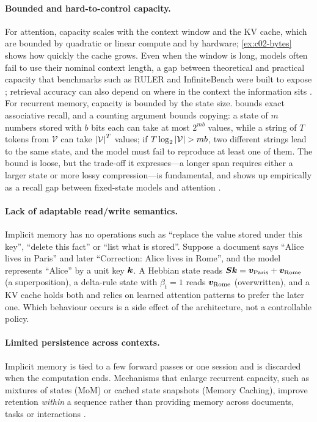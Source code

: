 \paragraph{Bounded and hard-to-control capacity.} For attention, capacity scales with the context
window and the KV cache, which are bounded by quadratic or linear compute and by hardware;
\cref{ex:c02-bytes} shows how quickly the cache grows. Even when the window is long, models often
fail to use their nominal context length, a gap between theoretical and practical capacity that
benchmarks such as RULER and InfiniteBench were built to expose \citep{hsieh2024ruler,zhang2024infbench};
retrieval accuracy can also depend on where in the context the information sits
\citep{c02-liu2024lost}. For recurrent memory, capacity is bounded by the state size.
 bounds exact associative recall, and a counting argument bounds copying:
a state of $m$ numbers stored with $b$ bits each can take at most $2^{mb}$ values, while a string of
$T$ tokens from $\mathcal{V}$ can take $\left\lvert \mathcal{V}\right\rvert^T$ values; if
$T\log_2\left\lvert \mathcal{V}\right\rvert > mb$, two different strings lead to the same state, and the model must
fail to reproduce at least one of them. The bound is loose, but the trade-off it expresses---a
longer span requires either a larger state or more lossy compression---is fundamental, and shows up
empirically as a recall gap between fixed-state models and attention
\citep{c02-jelassi2024repeat,c02-arora2023zoology,c02-arora2024based}.

\paragraph{Lack of adaptable read/write semantics.} Implicit memory has no operations such as
``replace the value stored under this key'', ``delete this fact'' or ``list what is stored''. Suppose
a document says ``Alice lives in Paris'' and later ``Correction: Alice lives in Rome'', and the
model represents ``Alice'' by a unit key $\bm{k}$. A Hebbian state reads
$\bm{S}\bm{k} = \bm{v}_{\text{Paris}} + \bm{v}_{\text{Rome}}$ (a superposition), a delta-rule state with $\beta_t = 1$ reads
$\bm{v}_{\text{Rome}}$ (overwritten), and a KV cache holds both and relies on learned attention
patterns to prefer the later one. Which behaviour occurs is a side effect of the architecture, not a
controllable policy.

\paragraph{Limited persistence across contexts.} Implicit memory is tied to a few forward passes
or one session and is discarded when the computation ends. Mechanisms that enlarge recurrent
capacity, such as mixtures of states (MoM) or cached state snapshots (Memory Caching), improve
retention \emph{within} a sequence rather than providing memory across documents, tasks or
interactions \citep{du2025mom,behrouz2026memorycaching}.

